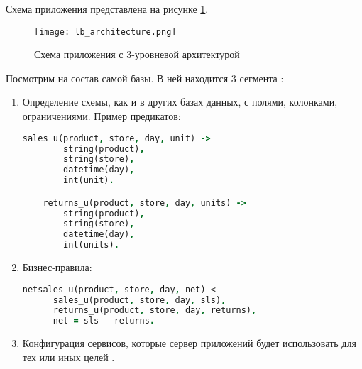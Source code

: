 Схема приложения \LB представлена на рисунке \ref{fig:technology:logicblox:lb_architecture}.

\begin{figure}
	\centering
	\texttt{[image: lb\_architecture.png]}
	\caption{Схема приложения \LB с 3-уровневой архитектурой \cite{lb_platform}}
	\label{fig:technology:logicblox:lb_architecture}
\end{figure}

Посмотрим на состав самой базы. В ней находится 3 сегмента \cite{lb_db_overview}:

\begin{enumerate}
	\item Определение схемы, как и в других базах данных, с полями, колонками, ограничениями. Пример предикатов:
	\begin{lstlisting}[language=Prolog]
	sales_u(product, store, day, unit) ->
		string(product),
		string(store),
		datetime(day),
		int(unit).

	returns_u(product, store, day, units) ->
		string(product),
		string(store),
		datetime(day),
		int(units).
	\end{lstlisting}
	\item Бизнес-правила:
	\begin{lstlisting}[language=Prolog]
	netsales_u(product, store, day, net) <-
	  sales_u(product, store, day, sls),
	  returns_u(product, store, day, returns),
	  net = sls - returns.
	\end{lstlisting}
	\item Конфигурация сервисов, которые сервер приложений будет использовать для тех или иных целей \cite{query_language_for_smart_db}.
\end{enumerate}
